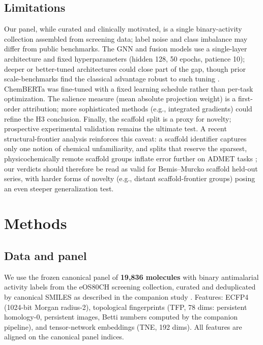 \documentclass[11pt,a4paper]{article}
\begin{document}
\subsection{Limitations}

Our panel, while curated and clinically motivated, is a single binary-activity collection assembled from screening data; label noise and class imbalance may differ from public benchmarks. The GNN and fusion models use a single-layer architecture and fixed hyperparameters (hidden 128, 50 epochs, patience 10); deeper or better-tuned architectures could close part of the gap, though prior scale-benchmarks find the classical advantage robust to such tuning \citep{guo_ding_2026}. ChemBERTa was fine-tuned with a fixed learning schedule rather than per-task optimization. The salience measure (mean absolute projection weight) is a first-order attribution; more sophisticated methods (e.g., integrated gradients) could refine the H3 conclusion. Finally, the scaffold split is a proxy for novelty; prospective experimental validation remains the ultimate test. A recent structural-frontier analysis reinforces this caveat: a scaffold identifier captures only one notion of chemical unfamiliarity, and splits that reserve the sparsest, physicochemically remote scaffold groups inflate error further on ADMET tasks \citep{scaffold_frontier_2026}; our verdicts should therefore be read as valid for Bemis--Murcko scaffold held-out series, with harder forms of novelty (e.g., distant scaffold-frontier groups) posing an even steeper generalization test.

\section{Methods}

\subsection{Data and panel}

We use the frozen canonical panel of \textbf{19,836 molecules} with binary antimalarial activity labels from the eOS80CH screening collection, curated and deduplicated by canonical SMILES as described in the companion study \citep{temgoua2026antimalarial}. Features: ECFP4 (1024-bit Morgan radius-2), topological fingerprints (TFP, 78 dims: persistent homology-0, persistent images, Betti numbers computed by the companion pipeline), and tensor-network embeddings (TNE, 192 dims). All features are aligned on the canonical panel indices.
\end{document}
